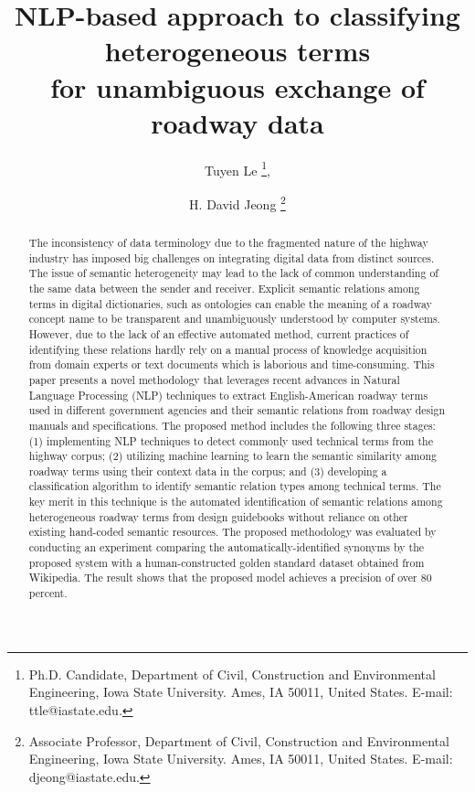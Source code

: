 \documentclass[Journal, BackFigs,NoLists, DoubleSpace]{ascelike}%
\begin{document}
\title{NLP-based approach to classifying heterogeneous terms \\for unambiguous exchange of roadway data}

%
\author{
Tuyen Le
\thanks{
Ph.D. Candidate, Department of Civil, Construction and Environmental Engineering, Iowa State University. Ames, IA 50011, United States. E-mail: ttle@iastate.edu.},
\and
H. David Jeong
\thanks{Associate Professor, Department of Civil, Construction and Environmental Engineering, Iowa State University. Ames, IA 50011, United States. E-mail: djeong@iastate.edu.}
 }

\maketitle

\begin{abstract} %
The inconsistency of data terminology due to the fragmented nature of the highway industry has imposed big challenges on integrating digital data from distinct sources. The issue of semantic heterogeneity may lead to the lack of common understanding of the same data between the sender and receiver. Explicit semantic relations among terms in digital dictionaries, such as ontologies can enable the meaning of a roadway concept name to be transparent and unambiguously understood by computer systems. However, due to the lack of an effective automated method, current practices of identifying these relations hardly rely on a manual process of knowledge acquisition from domain experts or text documents which is laborious and time-consuming.
This paper presents a novel methodology that leverages recent advances in Natural Language Processing (NLP) techniques to extract English-American roadway terms used in different government agencies and their semantic relations from roadway design manuals and specifications.
The proposed method includes the following three stages: (1) implementing NLP techniques to detect commonly used technical terms from the highway corpus; (2) utilizing machine learning to learn the semantic similarity among roadway terms using their context data in the corpus; and (3) developing a classification algorithm to identify semantic relation types among technical terms.
The key merit in this technique is the automated identification of semantic relations among heterogeneous roadway terms from design guidebooks without reliance on other existing hand-coded semantic resources.
The proposed methodology was evaluated by conducting an experiment comparing the automatically-identified synonyms by the proposed system with a human-constructed golden standard dataset obtained from Wikipedia. The result shows that the proposed model achieves a precision of over 80 percent.
  
\end{abstract}
\end{document}
